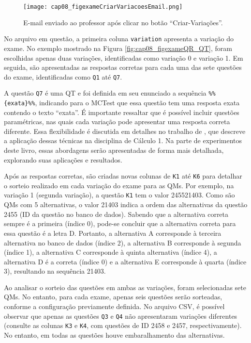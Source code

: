 \begin{figure}[!ht]
  \centering
  \texttt{[image: cap08\_figexameCriarVariacoesEmail.png]}
   \caption{E-mail enviado ao professor após clicar no botão ``Criar-Variações''.}
\label{fig:cap08_figexameCriarVariacoesEmail}
\end{figure}


No arquivo em questão, a primeira coluna \verb|variation| apresenta a variação do exame. No exemplo mostrado na Figura \ref{fig:cap08_figexameQR_QT}, foram escolhidas apenas duas variações, identificadas como variação 0 e variação 1. Em seguida, são apresentadas as respostas corretas para cada uma das sete questões do exame, identificadas como \verb|Q1| até \verb|Q7|.

A questão \verb|Q7| é uma QT e foi definida em seu enunciado a sequência \verb|%%{exata}%%|, indicando para o MCTest que essa questão tem uma resposta exata contendo o texto ``exata''. É importante ressaltar que é possível incluir questões paramétricas, nas quais cada variação pode apresentar uma resposta correta diferente. Essa flexibilidade é discutida em detalhes no trabalho de , que descreve a aplicação dessas técnicas na disciplina de Cálculo 1. Na parte de experimentos deste livro, essas abordagens serão apresentadas de forma mais detalhada, explorando suas aplicações e resultados.

Após as respostas corretas, são criadas novas colunas de \verb|K1| até \verb|K6| para detalhar o sorteio realizado em cada variação do exame para as QMs. Por exemplo, na variação 1 (segunda variação), a questão \verb|K1| tem o valor 245521403. Como são QMs com 5 alternativas, o valor 21403 indica a ordem das alternativas da questão 2455 (ID da questão no banco de dados). Sabendo que a alternativa correta sempre é a primeira (índice 0), pode-se concluir que a alternativa correta para essa questão é a letra D. Portanto, a alternativa A corresponde à terceira alternativa no banco de dados (índice 2), a alternativa B corresponde à segunda (índice 1), a alternativa C corresponde à quinta alternativa (índice 4), a alternativa D é a correta (índice 0) e a alternativa E corresponde à quarta (índice 3), resultando na sequência 21403. 

Ao analisar o sorteio das questões em ambas as variações, foram selecionadas sete QMs. No entanto, para cada exame, apenas seis questões serão sorteadas, conforme a configuração previamente definida. No arquivo CSV, é possível observar que apenas as questões \verb|Q3| e \verb|Q4| não apresentaram variações diferentes (consulte as colunas \verb|K3| e \verb|K4|, com questões de ID 2458 e 2457, respectivamente). No entanto, em todas as questões houve embaralhamento das alternativas.

